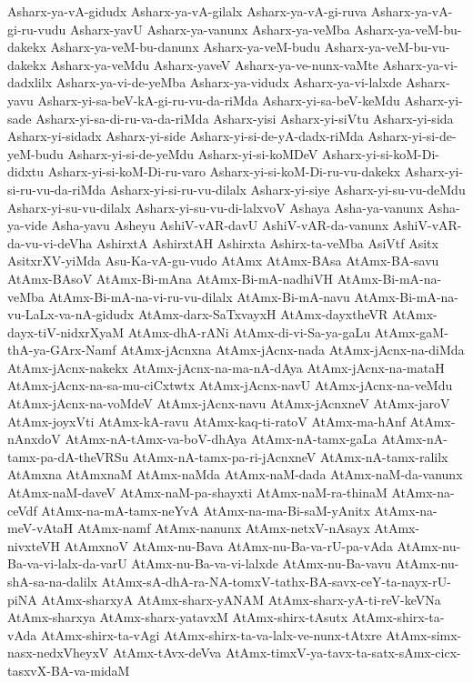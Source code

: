 {Asharx-ya-vA-gidudx
Asharx-ya-vA-gilalx
Asharx-ya-vA-gi-ruva
Asharx-ya-vA-gi-ru-vudu
Asharx-yavU
Asharx-ya-vanunx
Asharx-ya-veMba
Asharx-ya-veM-bu-dakekx
Asharx-ya-veM-bu-danunx
Asharx-ya-veM-budu
Asharx-ya-veM-bu-vu-dakekx
Asharx-ya-veMdu
Asharx-yaveV
Asharx-ya-ve-nunx-vaMte
Asharx-ya-vi-dadxlilx
Asharx-ya-vi-de-yeMba
Asharx-ya-vidudx
Asharx-ya-vi-lalxde
Asharx-yavu
Asharx-yi-sa-beV-kA-gi-ru-vu-da-riMda
Asharx-yi-sa-beV-keMdu
Asharx-yi-sade
Asharx-yi-sa-di-ru-va-da-riMda
Asharx-yisi
Asharx-yi-siVtu
Asharx-yi-sida
Asharx-yi-sidadx
Asharx-yi-side
Asharx-yi-si-de-yA-dadx-riMda
Asharx-yi-si-de-yeM-budu
Asharx-yi-si-de-yeMdu
Asharx-yi-si-koMDeV
Asharx-yi-si-koM-Di-didxtu
Asharx-yi-si-koM-Di-ru-varo
Asharx-yi-si-koM-Di-ru-vu-dakekx
Asharx-yi-si-ru-vu-da-riMda
Asharx-yi-si-ru-vu-dilalx
Asharx-yi-siye
Asharx-yi-su-vu-deMdu
Asharx-yi-su-vu-dilalx
Asharx-yi-su-vu-di-lalxvoV
Ashaya
Asha-ya-vanunx
Asha-ya-vide
Asha-yavu
Asheyu
AshiV-vAR-davU
AshiV-vAR-da-vanunx
AshiV-vAR-da-vu-vi-deVha
AshirxtA
AshirxtAH
Ashirxta
Ashirx-ta-veMba
AsiVtf
Asitx
AsitxrXV-yiMda
Asu-Ka-vA-gu-vudo
AtAmx
AtAmx-BAsa
AtAmx-BA-savu
AtAmx-BAsoV
AtAmx-Bi-mAna
AtAmx-Bi-mA-nadhiVH
AtAmx-Bi-mA-na-veMba
AtAmx-Bi-mA-na-vi-ru-vu-dilalx
AtAmx-Bi-mA-navu
AtAmx-Bi-mA-na-vu-LaLx-va-nA-gidudx
AtAmx-darx-SaTxvayxH
AtAmx-dayxtheVR
AtAmx-dayx-tiV-nidxrXyaM
AtAmx-dhA-rANi
AtAmx-di-vi-Sa-ya-gaLu
AtAmx-gaM-thA-ya-GArx-Namf
AtAmx-jAcnxna
AtAmx-jAcnx-nada
AtAmx-jAcnx-na-diMda
AtAmx-jAcnx-nakekx
AtAmx-jAcnx-na-ma-nA-dAya
AtAmx-jAcnx-na-mataH
AtAmx-jAcnx-na-sa-mu-ciCxtwtx
AtAmx-jAcnx-navU
AtAmx-jAcnx-na-veMdu
AtAmx-jAcnx-na-voMdeV
AtAmx-jAcnx-navu
AtAmx-jAcnxneV
AtAmx-jaroV
AtAmx-joyxVti
AtAmx-kA-ravu
AtAmx-kaq-ti-ratoV
AtAmx-ma-hAnf
AtAmx-nAnxdoV
AtAmx-nA-tAmx-va-boV-dhAya
AtAmx-nA-tamx-gaLa
AtAmx-nA-tamx-pa-dA-theVRSu
AtAmx-nA-tamx-pa-ri-jAcnxneV
AtAmx-nA-tamx-ralilx
AtAmxna
AtAmxnaM
AtAmx-naMda
AtAmx-naM-dada
AtAmx-naM-da-vanunx
AtAmx-naM-daveV
AtAmx-naM-pa-shayxti
AtAmx-naM-ra-thinaM
AtAmx-na-ceVdf
AtAmx-na-mA-tamx-neYvA
AtAmx-na-ma-Bi-saM-yAnitx
AtAmx-na-meV-vAtaH
AtAmx-namf
AtAmx-nanunx
AtAmx-netxV-nAsayx
AtAmx-nivxteVH
AtAmxnoV
AtAmx-nu-Bava
AtAmx-nu-Ba-va-rU-pa-vAda
AtAmx-nu-Ba-va-vi-lalx-da-varU
AtAmx-nu-Ba-va-vi-lalxde
AtAmx-nu-Ba-vavu
AtAmx-nu-shA-sa-na-dalilx
AtAmx-sA-dhA-ra-NA-tomxV-tathx-BA-savx-ceY-ta-nayx-rU-piNA
AtAmx-sharxyA
AtAmx-sharx-yANAM
AtAmx-sharx-yA-ti-reV-keVNa
AtAmx-sharxya
AtAmx-sharx-yatavxM
AtAmx-shirx-tAsutx
AtAmx-shirx-ta-vAda
AtAmx-shirx-ta-vAgi
AtAmx-shirx-ta-va-lalx-ve-nunx-tAtxre
AtAmx-simx-nasx-nedxVheyxV
AtAmx-tAvx-deVva
AtAmx-timxV-ya-tavx-ta-satx-sAmx-cicx-tasxvX-BA-va-midaM
}
